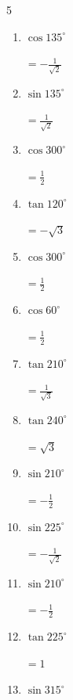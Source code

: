 \begin{multicols}{5}
\begin{enumerate}
        $\displaystyle =1$

  \item $\displaystyle \cos{135^\circ}$

        $\displaystyle =-\frac{1}{\sqrt{2}}$

  \item $\displaystyle \sin{135^\circ}$

        $\displaystyle =\frac{1}{\sqrt{2}}$

\columnbreak %

  \item $\displaystyle \cos{300^\circ}$

        $\displaystyle =\frac{1}{2}$

  \item $\displaystyle \tan{120^\circ}$

        $\displaystyle =-\sqrt{3}$

  \item $\displaystyle \cos{300^\circ}$

        $\displaystyle =\frac{1}{2}$

  \item $\displaystyle \cos{60^\circ}$

        $\displaystyle =\frac{1}{2}$

  \item $\displaystyle \tan{210^\circ}$

        $\displaystyle =\frac{1}{\sqrt{3}}$

  \item $\displaystyle \tan{240^\circ}$

        $\displaystyle =\sqrt{3}$

  \item $\displaystyle \sin{210^\circ}$

        $\displaystyle =-\frac{1}{2}$

  \item $\displaystyle \sin{225^\circ}$

        $\displaystyle =-\frac{1}{\sqrt{2}}$

  \item $\displaystyle \sin{210^\circ}$

        $\displaystyle =-\frac{1}{2}$

  \item $\displaystyle \tan{225^\circ}$

        $\displaystyle =1$

  \item $\displaystyle \sin{315^\circ}$


\end{enumerate}
\end{multicols}
